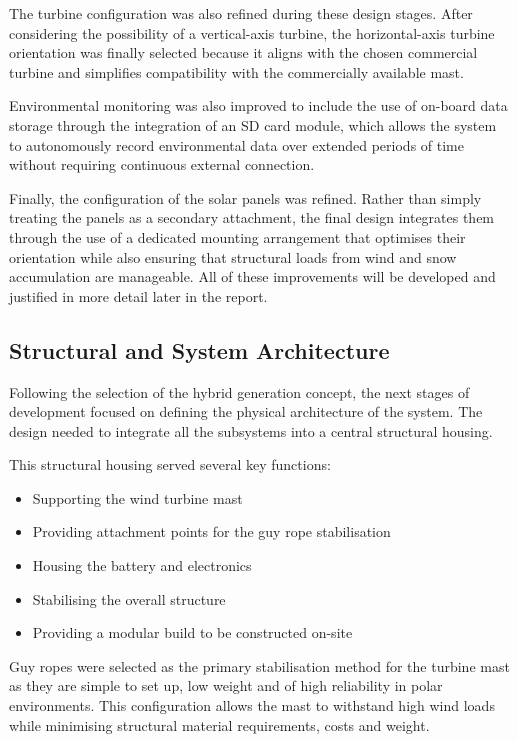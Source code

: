 \documentclass[11pt,a4paper]{article}
\begin{document}
The turbine configuration was also refined during these design stages. After considering the possibility of a vertical-axis turbine, the horizontal-axis turbine orientation was finally selected because it aligns with the chosen commercial turbine and simplifies compatibility with the commercially available mast.

Environmental monitoring was also improved to include the use of on-board data storage through the integration of an SD card module, which allows the system to autonomously record environmental data over extended periods of time without requiring continuous external connection.

Finally, the configuration of the solar panels was refined. Rather than simply treating the panels as a secondary attachment, the final design integrates them through the use of a dedicated mounting arrangement that optimises their orientation while also ensuring that structural loads from wind and snow accumulation are manageable. All of these improvements will be developed and justified in more detail later in the report.

\subsection{Structural and System Architecture}
Following the selection of the hybrid generation concept, the next stages of development focused on defining the physical architecture of the system. The design needed to integrate all the subsystems into a central structural housing.

\medskip

This structural housing served several key functions:

\begin{itemize}
\item Supporting the wind turbine mast
\item Providing attachment points for the guy rope stabilisation
\item Housing the battery and electronics
\item Stabilising the overall structure
\item Providing a modular build to be constructed on-site
\end{itemize}

Guy ropes were selected as the primary stabilisation method for the turbine mast as they are simple to set up, low weight and of high reliability in polar environments. This configuration allows the mast to withstand high wind loads while minimising structural material requirements, costs and weight.
\end{document}
